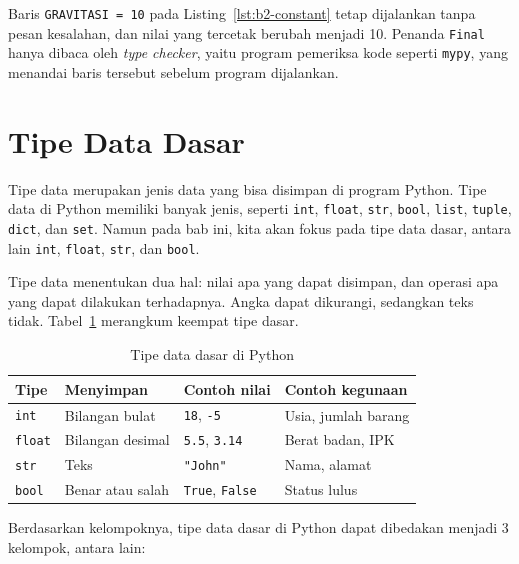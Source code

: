 Baris \texttt{GRAVITASI = 10} pada Listing~\ref{lst:b2-constant} tetap dijalankan tanpa pesan kesalahan, dan nilai yang tercetak berubah menjadi 10. Penanda \texttt{Final} hanya dibaca oleh \textit{type checker}, yaitu program pemeriksa kode seperti \texttt{mypy}, yang menandai baris tersebut sebelum program dijalankan.

\section{Tipe Data Dasar}

Tipe data merupakan jenis data yang bisa disimpan di program Python. Tipe data di Python memiliki banyak jenis, seperti \texttt{int}, \texttt{float}, \texttt{str}, \texttt{bool}, \texttt{list}, \texttt{tuple}, \texttt{dict}, dan \texttt{set}. Namun pada bab ini, kita akan fokus pada tipe data dasar, antara lain \texttt{int}, \texttt{float}, \texttt{str}, dan \texttt{bool}.


Tipe data menentukan dua hal: nilai apa yang dapat disimpan, dan operasi apa yang dapat dilakukan terhadapnya. Angka dapat dikurangi, sedangkan teks tidak. Tabel~\ref{tab:b2-tipe-dasar} merangkum keempat tipe dasar.

\begin{table}[H]
  \centering
  \caption{Tipe data dasar di Python}
  \label{tab:b2-tipe-dasar}
  \begin{tabularx}{\textwidth}{lXlX}
    \hline
    \textbf{Tipe} & \textbf{Menyimpan} & \textbf{Contoh nilai} & \textbf{Contoh kegunaan} \\
    \hline
    \texttt{int} & Bilangan bulat & \texttt{18}, \texttt{-5} & Usia, jumlah barang \\
    \hline
    \texttt{float} & Bilangan desimal & \texttt{5.5}, \texttt{3.14} & Berat badan, IPK \\
    \hline
    \texttt{str} & Teks & \texttt{"John"} & Nama, alamat \\
    \hline
    \texttt{bool} & Benar atau salah & \texttt{True}, \texttt{False} & Status lulus \\
    \hline
  \end{tabularx}
\end{table}

Berdasarkan kelompoknya, tipe data dasar di Python dapat dibedakan menjadi 3 kelompok, antara lain:

